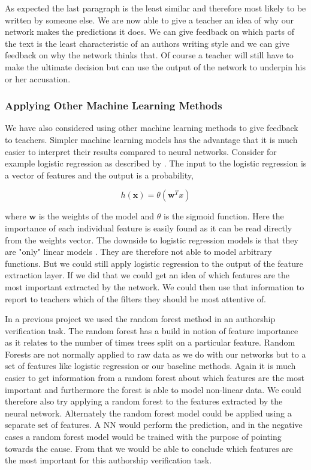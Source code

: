 As expected the last paragraph is the least similar and therefore most likely to
be written by someone else. We are now able to give a teacher an idea of why our
network makes the predictions it does. We can give feedback on which parts of
the text is the least characteristic of an authors writing style and we can give
feedback on why the network thinks that. Of course a teacher will still have to
make the ultimate decision but can use the output of the network to underpin his
or her accusation.

\subsubsection{Applying Other Machine Learning Methods}

We have also considered using other machine learning methods to give feedback to
teachers. Simpler machine learning models has the advantage that it is much
easier to interpret their results compared to neural networks. Consider for
example logistic regression as described by \citet{Abu-Mostafa:2012:LD:2207825}.
The input to the logistic regression is a vector of features and the output is a
probability,

\begin{equation}
    h(\mathbf{x}) = \theta(\mathbf{w}^Tx)
\end{equation}

where $\mathbf{w}$ is the weights of the model and $\theta$ is the sigmoid
function. Here the importance of each individual feature is easily
found as it can be read directly from the weights vector. The downside
to logistic regression models is that they are "only" linear models
\citet{Abu-Mostafa:2012:LD:2207825}. They are therefore not able to model
arbitrary functions. But we could still apply logistic regression to the output
of the feature extraction layer. If we did that we could get an idea of which
features are the most important extracted by the network. We could then use that
information to report to teachers which of the filters they should be most
attentive of.

In a previous project \citep{US} we used the random forest method in an
authorship verification task. The random forest has a build in notion of feature
importance as it relates to the number of times trees split on a particular
feature. Random Forests are not normally applied to raw data as we do with our
networks but to a set of features like logistic regression or our baseline
methods. Again it is much easier to get information from a random forest about
which features are the most important and furthermore the forest is able to
model non-linear data. We could therefore also try applying a random forest to
the features extracted by the neural network. Alternately the random forest
model could be applied using a separate set of features. A \gls{NN} would
perform the prediction, and in the negative cases a random forest model would be
trained with the purpose of pointing towards the cause. From that we would be
able to conclude which features are the most important for this authorship
verification task.

